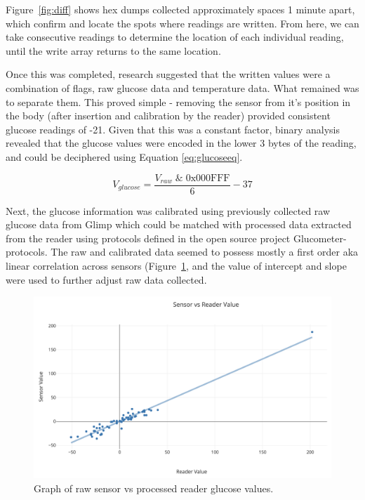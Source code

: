 Figure~\ref{fig:diff} shows hex dumps collected approximately spaces 1 minute apart, which confirm and locate the spots where readings are written. From here, we can take consecutive readings to determine the location of each individual reading, until the write array returns to the same location.

Once this was completed, research suggested that the written values were a combination of flags, raw glucose data and temperature data. What remained was to separate them. This proved simple - removing the sensor from it's position in the body (after insertion and calibration by the reader) provided consistent glucose readings of -21. Given that this was a constant factor, binary analysis revealed that the glucose values were encoded in the lower 3 bytes of the reading, and could be deciphered using Equation \ref{eq:glucoseeq}.

\begin{equation} \label{eq:glucoseeq}
V_{glucose} = \frac{V_{raw}\;\mathrm{\&\; 0x000FFF}}{6}-37 
\end{equation}

Next, the glucose information was calibrated using previously collected raw glucose data from Glimp\cite{software_glimp_2017} which could be matched with processed data extracted from the reader using protocols defined in the open source project Glucometer-protocols\cite{petteno_glucometer-protocols:_2017}. The raw and calibrated data seemed to possess mostly a first order aka linear correlation across sensors (Figure~\ref{fig:corr}, and the value of intercept and slope were used to further adjust raw data collected.

\begin{figure}[ht]
\centering\includegraphics[width=1.0\linewidth]{images/sensorvsreader.png}
\caption{Graph of raw sensor vs processed reader glucose values.}
\label{fig:corr}
\end{figure}

